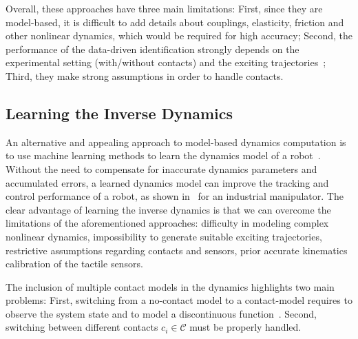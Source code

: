       Overall, these approaches have three main limitations: 
      First, since they are model-based, it is difficult to add details about couplings, elasticity, friction and other nonlinear dynamics, which would be required for high accuracy; 
      Second, the performance of the data-driven identification strongly depends on the experimental setting (with/without contacts) and the exciting trajectories~\cite{Pedrocchi2014}; 
      Third, they make strong assumptions in order to handle contacts.




\subsection{Learning the Inverse Dynamics}

        An alternative and appealing approach to model-based dynamics computation is to use machine learning methods to learn the dynamics model of a robot~\cite{Nguyen-Tuong2008,Vijayakumar2000,Deisenroth2012}. 
        Without the need to compensate for inaccurate dynamics parameters and accumulated errors, a learned dynamics model can improve the tracking and control performance of a robot, as shown in~\cite{Nguyen-Tuong2011} for an industrial manipulator.
        The clear advantage of learning the inverse dynamics is that we can overcome the limitations of the aforementioned approaches: difficulty in modeling complex nonlinear dynamics, impossibility to generate suitable exciting trajectories, restrictive assumptions regarding contacts and sensors, prior accurate kinematics calibration of the tactile sensors.
    
        The inclusion of multiple contact models in the dynamics highlights two main problems:
        First, switching from a no-contact model to a contact-model requires to observe the system state and to model a discontinuous function~\cite{Toussaint2005}. 
        Second, switching between different contacts $c_i \in\mathcal{C}$ must be properly handled. %

